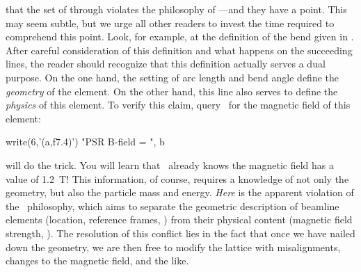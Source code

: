  that the set of
 through  violates the
philosophy of \PTC---and they have a point. This may seem subtle,
but we urge all other readers to invest the time required to
comprehend this point. Look, for example, at the definition of the
bend given in . After careful consideration of this
definition and what happens on the succeeding lines, the reader
should recognize that this definition actually serves a dual purpose.
On the one hand, the setting of arc length and bend angle define the
\emph{geometry} of the element. On the other hand, this line also
serves to define the \emph{physics} of this element. To verify this
claim, query \PTC\ for the magnetic field of this element:
\begin{ptccode}[frame=none]
  write(6,'(a,f7.4)') "PSR B-field = ", b%
\end{ptccode}
will do the trick. You will learn that \PTC\ already knows the
magnetic field has a value of \SI{1.2}{T}! This information, of
course, requires a knowledge of not only the geometry, but also the
particle mass and energy. \emph{Here} is the apparent violation of
the \PTC\ philosophy, which aims to separate the geometric
description of beamline elements (location, reference frames, \etc)
from their physical content (magnetic field strength, \etc). The
resolution of this conflict lies in the fact that once we have
nailed down the geometry, we are then free to modify the lattice
with misalignments, changes to the magnetic field, and the like.

